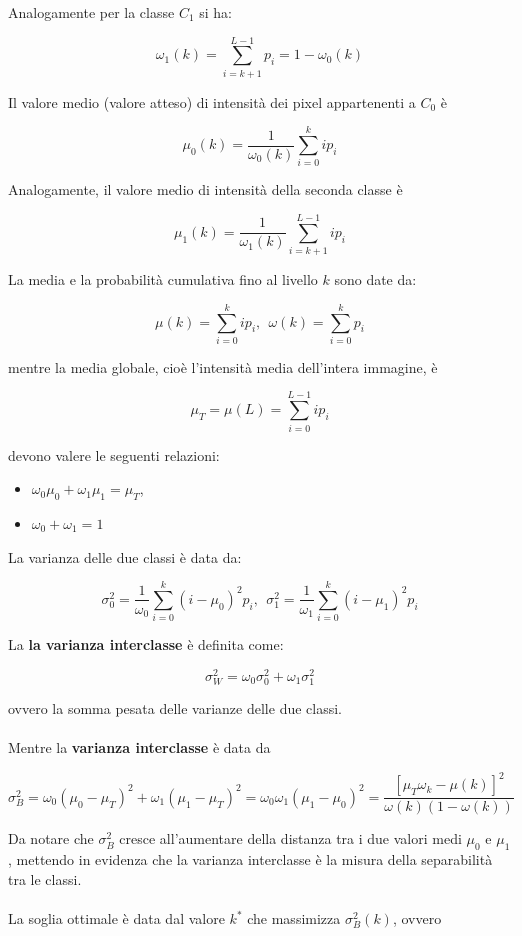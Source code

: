 Analogamente per la classe $C_1$ si ha:

$$
    \omega_1(k) = \sum_{i=k+1}^{L-1}p_i=1-\omega_0(k)
$$

Il valore medio (valore atteso) di intensità dei pixel appartenenti a $C_0$ è

$$
    \mu_0(k)=\frac{1}{\omega_0(k)} \sum_{i=0}^{k}ip_i
$$

Analogamente, il valore medio di intensità della seconda classe è

$$
    \mu_1(k)=\frac{1}{\omega_1(k)}\sum_{i=k+1}^{L-1}ip_i
$$

La media e la probabilità cumulativa fino al livello $k$ sono date da:

$$
    \mu(k)=\sum_{i=0}^{k}ip_i, \ \ \omega(k)=\sum_{i=0}^{k}p_i
$$

mentre la media globale, cioè l'intensità media dell'intera immagine, è

$$
    \mu_T=\mu(L)=\sum_{i=0}^{L-1}ip_i
$$

devono valere le seguenti relazioni:

\begin{itemize}
    \item $\omega_0 \mu_0 + \omega_1 \mu_1 = \mu_T$,
    \item $\omega_0 + \omega_1 = 1$
\end{itemize}

La varianza delle due classi è data da:

$$
    \sigma^2_0 = \frac{1}{\omega_0}\sum_{i=0}^{k}(i-\mu_0)^2p_i, \ \ \sigma^2_1 = \frac{1}{\omega_1}\sum_{i=0}^{k}(i-\mu_1)^2p_i
$$

La \textbf{la varianza interclasse} è definita come:

$$\sigma^2_W = \omega_0 \sigma^2_0 + \omega_1 \sigma^2_1
$$

ovvero la somma pesata delle varianze delle due classi.
\\\\Mentre la \textbf{varianza interclasse} è data da

$$
    \sigma^2_B = \omega_0(\mu_0 - \mu_T)^2 + \omega_1(\mu_1 - \mu_T)^2 =
    \omega_0\omega_1(\mu_1-\mu_0)^2 =
    \frac{\left[\mu_T \omega_k - \mu(k)\right]^2}{\omega(k)(1-\omega(k))}
$$

Da notare che $\sigma^2_B$  cresce all'aumentare della distanza tra i due valori medi $\mu_0$ e $\mu_1$, mettendo in evidenza che la varianza interclasse è la misura della separabilità tra le classi.
\\\\
La soglia ottimale è data dal valore $k^*$ che massimizza $\sigma^2_B(k)$, ovvero

